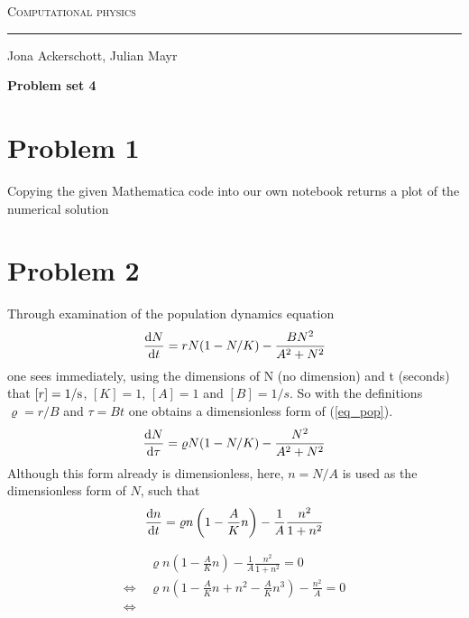 \documentclass[12pt, a4paper]{article}
\begin{document}
  \centerline{\Huge\scshape Computational physics}
  \vspace*{0.5cm}
  \hrule
  \vspace*{0.5cm}
  \centerline{Jona Ackerschott, Julian Mayr}
  \vspace*{1cm}
  \centerline{\Large\bfseries Problem set 4}
  \vspace*{0.5cm}

  \section*{Problem 1}
  Copying the given Mathematica code into our own notebook returns a plot of the numerical solution
  
  
  
  \section*{Problem 2}
  Through examination of the population dynamics equation
  \begin{align}
    \frac{{\rm d} N}{{\rm d} t} = r N (1 - N / K) - \frac{B N^2}{A^2+N^2}
    \label{eq_pop}
  \end{align}
  one sees immediately, using the dimensions of N (no dimension) and t
  (seconds) that $[r] = 1/{\rm s}$, $[K] = 1$, $[A] = 1$ and $[B] = 1/s$.
  So with the definitions $\varrho = r / B$ and $\tau = B t$ one obtains a
  dimensionless form of (\ref{eq_pop}).
  \begin{align}
    \frac{{\rm d} N}{{\rm d} \tau} = \varrho N (1 - N / K)
      - \frac{N^2}{A^2 + N^2}
  \end{align}
  Although this form already is dimensionless, here, $n = N / A$ is used
  as the \glqq dimensionless form\grqq{} of $N$, such that
  \begin{align}
    \frac{{\rm d} n}{{\rm d} t} = \varrho n \left(1 - \frac{A}{K} n\right)
      - \frac{1}{A} \frac{n^2}{1 + n^2}
  \end{align}

  \begin{align}
    & \varrho n \left(1 - \frac{A}{K} n \right)
      - \frac{1}{A} \frac{n^2}{1 + n^2} = 0 \nonumber \\
    \Leftrightarrow \ & \varrho n \left(1 - \frac{A}{K} n + n^2
    - \frac{A}{K} n^3 \right) - \frac{n^2}{A} = 0 \nonumber \\
    \Leftrightarrow \ & 
  \end{align}
\end{document}
